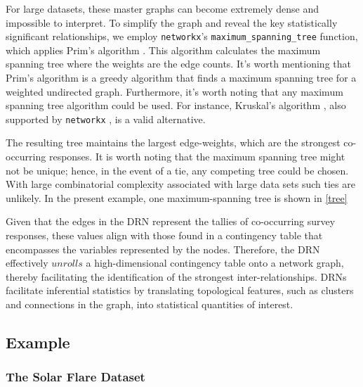 For large datasets, these master graphs can become extremely dense and impossible to interpret. To simplify the graph and reveal the key statistically significant relationships, we employ \texttt{networkx}'s \texttt{maximum\_spanning\_tree} function, which applies Prim's algorithm \citep{dijkstra1959note}. This algorithm calculates the maximum spanning tree where the weights are the edge counts. It's worth mentioning that Prim's algorithm is a greedy algorithm that finds a maximum spanning tree for a weighted undirected graph. Furthermore, it's worth noting that any maximum spanning tree algorithm could be used. For instance, Kruskal's algorithm \citep{kruskal1956shortest}, also supported by \texttt{networkx} \citep{SciPyProceedings_11}, is a valid alternative.

The resulting tree maintains the largest edge-weights, which are the strongest co-occurring responses. It is worth noting that the maximum spanning tree might not be unique; hence, in the event of a tie, any competing tree could be chosen. With large combinatorial complexity associated with large data sets such ties are unlikely. In the present example, one maximum-spanning tree is shown in \autoref{tree}

Given that the edges in the DRN represent the tallies of co-occurring survey responses, these values align with those found in a contingency table that encompasses the variables represented by the nodes. Therefore, the DRN effectively $unrolls$ a high-dimensional contingency table onto a network graph, thereby facilitating the identification of the strongest inter-relationships. DRNs facilitate inferential statistics by translating topological features, such as clusters and connections in the graph, into statistical quantities of interest.

\subsection{Example}\label{Example}
\subsubsection{The Solar Flare Dataset}


